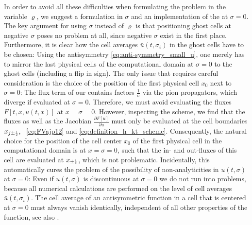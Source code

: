 In order to avoid all these difficulties when formulating the problem in the variable $\varrho$, we suggest a formulation in $\sigma$ and an implementation of the \bc{} at $\sigma = 0$.
The key argument for using $\sigma$ instead of $\varrho$ is that positioning ghost cells at negative $\sigma$ poses no problem at all, since negative $\sigma$ exist in the first place. 
Furthermore, it is clear how the cell averages $\bar{u} ( t, \sigma_i )$ in the ghost cells have to be chosen: Using the antisymmetry \eqref{eq:anti-symmetry_small_u}, one merely has to mirror the last physical cells of the computational domain at $\sigma = 0$ to the ghost cells (including a flip in sign).
The only issue that requires careful consideration is the choice of the position of the first physical cell $x_0$ next to $\sigma = 0$: The flux term of our \pde{} contains factors $\frac{1}{\sigma}$ via the pion propagators, which diverge if evaluated at $\sigma = 0$.
Therefore, we must avoid evaluating the fluxes $F [ t, x, u ( t, x ) ]$ at $x = \sigma = 0$.
However, inspecting the \kt{} scheme, we find that the fluxes as well as the Jacobian $ \frac{\partial F[u]}{\partial u}$ must only be evaluated at the cell boundaries $x_{j \pm \ttfrac{1}{2}}$, \cf{}\ \cref{eq:FVajp12} and \eqref{eq:definition_h_kt_scheme}.
Consequently, the natural choice for the position of the cell center $x_0$ of the first physical cell in the computational domain is at $x = \sigma = 0$, such that the in- and out-fluxes of this cell are evaluated at $x_{\pm \ttfrac{1}{2}}$, which is not problematic.
Incidentally, this automatically cures the problem of the possibility of non-analyticities in $u ( t, \sigma )$ at $\sigma = 0$: Even if $u ( t, \sigma )$ is discontinuous at $\sigma = 0$ we do not run into problems, because all numerical calculations are performed on the level of cell averages $\bar{u} ( t, \sigma_i )$.
The cell average of an antisymmetric function in a cell that is centered at $\sigma = 0$ must always vanish identically, independent of all other properties of the function, see also .

